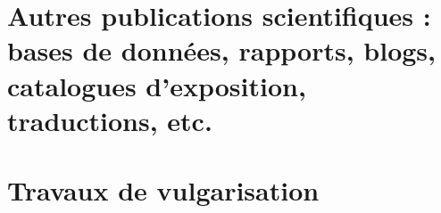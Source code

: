 \documentclass{article}
\begin{document}

\section[Autres publications scientifiques]{Autres publications scientifiques : bases de données, rapports, blogs, catalogues d'exposition, traductions, etc.}

\printbibliography[heading=subbibliography,keyword=autre2017,heading=none]

\section{Travaux de vulgarisation}

\printbibliography[heading=subbibliography,keyword=vulgarisation2017,heading=none]
\end{document}
